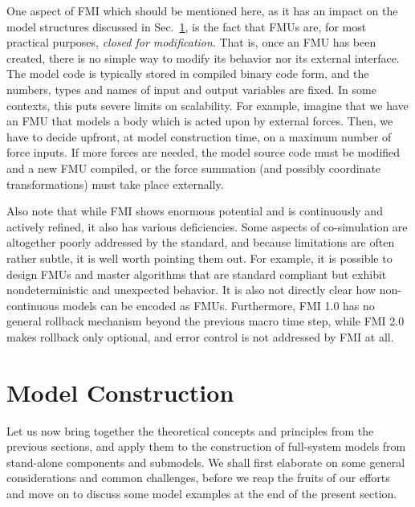 \documentclass[prb,aps,showpacs,floatfix,twocolumn,10pt]{revtex4-1}
\theoremstyle{plain}
\theoremstyle{remark}
\begin{document}
One aspect of FMI which should be mentioned here, as it has an impact on the model structures discussed in Sec.~\ref{sec:construction}, is the fact that FMUs are, for most practical purposes, \emph{closed for modification}.
That is, once an FMU has been created, there is no simple way to modify its behavior nor its external interface.
The model code is typically stored in compiled binary code form, and the numbers, types and names of input and output variables are fixed.
In some contexts, this puts severe limits on scalability.
For example, imagine that we have an FMU that models a body which is acted upon by external forces.
Then, we have to decide upfront, at model construction time, on a maximum number of force inputs.
If more forces are needed, the model source code must be modified and a new FMU compiled, or the force summation (and possibly coordinate transformations) must take place externally.

Also note that while FMI shows enormous potential and is continuously and actively refined, it also has various deficiencies.
Some aspects of co-simulation are altogether poorly addressed by the standard, and because limitations are often rather subtle, it is well worth pointing them out.
For example, it is possible to design FMUs and master algorithms that are standard compliant but exhibit nondeterministic and unexpected behavior.\cite{Broman2013}
It is also not directly clear how non-continuous models can be encoded as FMUs.\cite{Feldman2014,Tripakis2014,Broman2015}
Furthermore, FMI 1.0 has no general rollback mechanism beyond the previous macro time step, while FMI 2.0 makes rollback only optional, and error control is not addressed by FMI at all.\cite{Broman2013}






\section{Model Construction}
\label{sec:construction}

Let us now bring together the theoretical concepts and principles from the previous sections, and apply them to the construction of full-system models from stand-alone components and submodels.
We shall first elaborate on some general considerations and common challenges, before we reap the fruits of our efforts and move on to discuss some model examples at the end of the present section.
\end{document}

